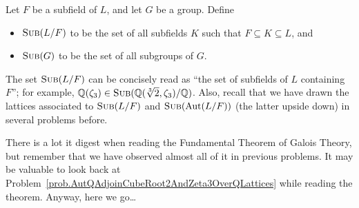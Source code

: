 \begin{notation}
Let $F$ be a subfield of $L$, and let $G$ be a group. Define 
\begin{itemize}
\item $\operatorname{\textsc{Sub}}(L/F)$ to be the set of all subfields $K$ such that $F\subseteq K\subseteq L$, and 
\item $\operatorname{\textsc{Sub}}(G)$ to be the set of all subgroups of  $G$.
\end{itemize}
\end{notation}

The set $\operatorname{\textsc{Sub}}(L/F)$ can be concisely read as ``the set of subfields of $L$ containing $F$''; for example, $\mathbb{Q}(\zeta_3) \in \operatorname{\textsc{Sub}}(\mathbb{Q}(\sqrt[3]{2},\zeta_3)/\mathbb{Q})$. Also, recall that we have drawn the lattices associated to $\operatorname{\textsc{Sub}}(L/F)$ and $\operatorname{\textsc{Sub}}(\operatorname{Aut}(L/F))$ (the latter upside down) in several problems before. 

There is a lot it digest when reading the Fundamental Theorem of Galois Theory, but remember that we have observed almost all of it in previous problems. It may be valuable to look back at Problem~\ref{prob.AutQAdjoinCubeRoot2AndZeta3OverQLattices} while reading the theorem. Anyway, here we go\ldots

